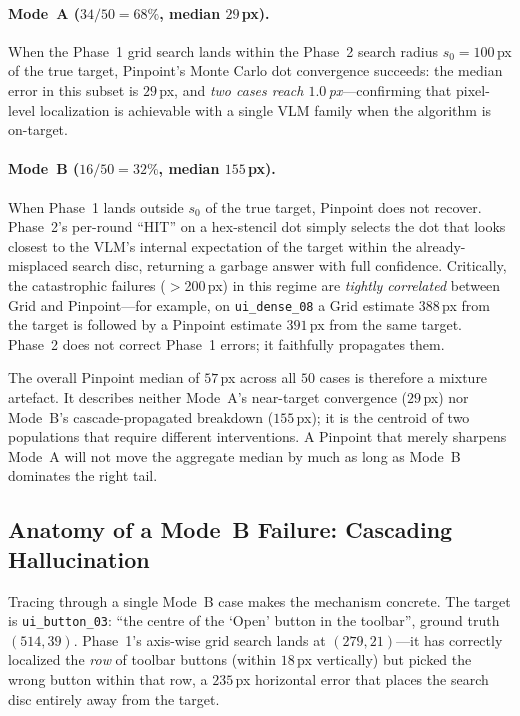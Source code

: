 \paragraph{Mode~A ($34/50 = 68\%$, median $29$\,px).}
When the Phase~1 grid search lands within the Phase~2 search radius
$s_0 = 100$\,px of the true target, Pinpoint's Monte Carlo dot
convergence succeeds: the median error in this subset is
$29$\,px, and \emph{two cases reach $1.0$\,px}---confirming that
pixel-level localization is achievable with a single VLM family
when the algorithm is on-target.

\paragraph{Mode~B ($16/50 = 32\%$, median $155$\,px).}
When Phase~1 lands outside $s_0$ of the true target, Pinpoint does not
recover.  Phase~2's per-round ``HIT'' on a hex-stencil dot simply
selects the dot that looks closest to the VLM's internal expectation
of the target within the already-misplaced search disc, returning a
garbage answer with full confidence.  Critically, the catastrophic
failures
($>$200\,px) in this regime are \emph{tightly correlated} between
Grid and Pinpoint---for example, on \texttt{ui\_dense\_08} a Grid
estimate $388$\,px from the target is followed by a Pinpoint
estimate $391$\,px from the same target.  Phase~2 does not correct
Phase~1 errors; it faithfully propagates them.

The overall Pinpoint median of $57$\,px across all $50$ cases is
therefore a mixture artefact.  It describes neither Mode~A's
near-target convergence ($29$\,px) nor Mode~B's cascade-propagated
breakdown ($155$\,px); it is the centroid of two populations that
require different interventions.  A Pinpoint that merely sharpens
Mode~A will not move the aggregate median by much as long as Mode~B
dominates the right tail.

\subsection{Anatomy of a Mode~B Failure: Cascading Hallucination}
\label{sec:taxonomy-cascade}

Tracing through a single Mode~B case makes the mechanism concrete.
The target is \texttt{ui\_button\_03}: ``the centre of the `Open'
button in the toolbar'', ground truth $(514, 39)$.  Phase~1's
axis-wise grid search lands at $(279, 21)$---it has correctly
localized the \emph{row} of toolbar buttons (within $18$\,px
vertically) but picked the wrong button within that row, a
$235$\,px horizontal error that places the search disc entirely
away from the target.

